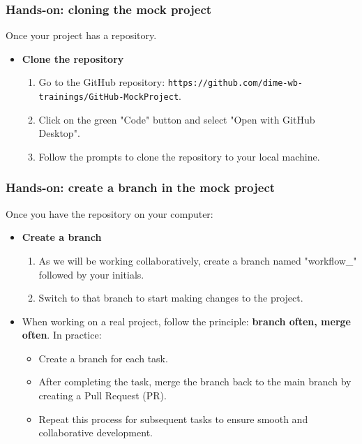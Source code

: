 \documentclass[aspectratio=169]{beamer}
\begin{document}
\begin{frame}
\frametitle{Hands-on: cloning the mock project}
Once your project has a repository. 
\begin{itemize}
    \item \textbf{Clone the repository}
    \begin{enumerate}
        \item Go to the GitHub repository: \texttt{https://github.com/dime-wb-trainings/GitHub-MockProject}.
        \item Click on the green "Code" button and select "Open with GitHub Desktop".
        \item Follow the prompts to clone the repository to your local machine.
    \end{enumerate}
    \end{itemize}
\end{frame}

\begin{frame}
\frametitle{Hands-on: create a branch in the mock project}
Once you have the repository on your computer:
\begin{itemize}
    \item \textbf{Create a branch}
    \begin{enumerate}
        \item As we will be working collaboratively, create a branch named "workflow\_" followed by your initials.
        \item Switch to that branch to start making changes to the project.
    \end{enumerate}
    \item When working on a real project, follow the principle: \textbf{branch often, merge often}. In practice:
    \begin{itemize}
        \item Create a branch for each task.
        \item After completing the task, merge the branch back to the main branch by creating a Pull Request (PR).
        \item Repeat this process for subsequent tasks to ensure smooth and collaborative development.
    \end{itemize}
\end{itemize}
\end{frame}
\end{document}
